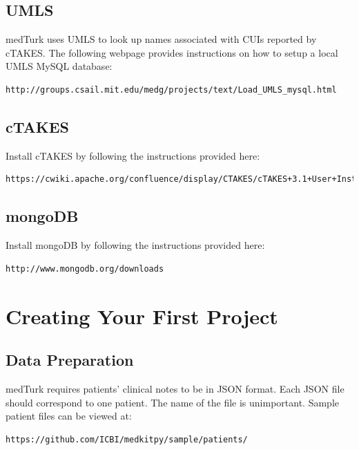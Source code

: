 \documentclass{book}
\begin{document}
\section{UMLS}
medTurk uses UMLS to look up names associated with CUIs reported by cTAKES. The following webpage provides instructions on how to setup a local UMLS MySQL database:

\begin{verbatim}
http://groups.csail.mit.edu/medg/projects/text/Load_UMLS_mysql.html
\end{verbatim}

\section{cTAKES}
Install cTAKES by following the instructions provided here:

\begin{verbatim}
https://cwiki.apache.org/confluence/display/CTAKES/cTAKES+3.1+User+Install+Guide
\end{verbatim}





\section{mongoDB}
Install mongoDB by following the instructions provided here:

\begin{verbatim}
http://www.mongodb.org/downloads
\end{verbatim}


\chapter{Creating Your First Project}

\section{Data Preparation}
medTurk requires patients' clinical notes to be in JSON format. Each JSON file should correspond to one patient. The name of the file is unimportant. Sample patient files can be viewed at:

\begin{verbatim}
https://github.com/ICBI/medkitpy/sample/patients/
\end{verbatim}
\end{document}
